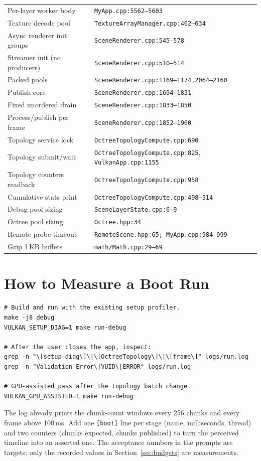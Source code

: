 \documentclass[11pt,a4paper]{article}
\begin{document}
{\begin{longtable}{@{}L{8.2cm}L{7.0cm}@{}}
Per-layer worker body & \texttt{MyApp.cpp:5562--5603} \\
Texture decode pool & \texttt{TextureArrayManager.cpp:462--634} \\
Async renderer init groups & \texttt{SceneRenderer.cpp:545--578} \\
Streamer init (no producers) & \texttt{SceneRenderer.cpp:510--514} \\
Packed pools & \texttt{SceneRenderer.cpp:1169--1174,2064--2160} \\
Publish core & \texttt{SceneRenderer.cpp:1694--1831} \\
Fixed unordered drain & \texttt{SceneRenderer.cpp:1833--1850} \\
Process/publish per frame & \texttt{SceneRenderer.cpp:1852--1960} \\
Topology service lock & \texttt{OctreeTopologyCompute.cpp:690} \\
Topology submit/wait & \texttt{OctreeTopologyCompute.cpp:825}, \texttt{VulkanApp.cpp:1155} \\
Topology counters readback & \texttt{OctreeTopologyCompute.cpp:958} \\
Cumulative stats print & \texttt{OctreeTopologyCompute.cpp:498--514} \\
Debug pool sizing & \texttt{SceneLayerState.cpp:6--9} \\
Octree pool sizing & \texttt{Octree.hpp:34} \\
Remote probe timeout & \texttt{RemoteScene.hpp:65; MyApp.cpp:984--999} \\
Gzip 1\,KB buffers & \texttt{math/Math.cpp:29--69} \\
\bottomrule
\end{longtable}
}

\section{How to Measure a Boot Run}

\begin{lstlisting}
# Build and run with the existing setup profiler.
make -j8 debug
VULKAN_SETUP_DIAG=1 make run-debug

# After the user closes the app, inspect:
grep -n "\[setup-diag\]\|\[OctreeTopology\]\|\[frame\]" logs/run.log
grep -n "Validation Error\|VUID\|ERROR" logs/run.log

# GPU-assisted pass after the topology batch change.
VULKAN_GPU_ASSISTED=1 make run-debug
\end{lstlisting}

The log already prints the chunk-count windows every 256 chunks and every
frame above 100\,ms. Add one \texttt{[boot]} line per stage (name,
milliseconds, thread) and two counters (chunks expected, chunks published)
to turn the perceived timeline into an asserted one. The acceptance numbers
in the prompts are targets; only the recorded values in
Section~\ref{sec:budgets} are measurements.
\end{document}
